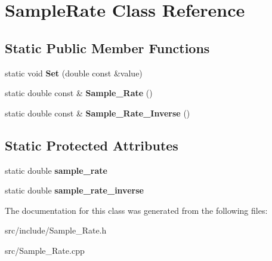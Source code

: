 \hypertarget{class_sample_rate}{\section{Sample\+Rate Class Reference}
\label{class_sample_rate}
}
\subsection*{Static Public Member Functions}
\begin{DoxyCompactItemize}
\item 
\hypertarget{class_sample_rate_aaaf581982c53f3392e79e425f978b510}{static void {\bfseries Set} (double const \&value)}\label{class_sample_rate_aaaf581982c53f3392e79e425f978b510}

\item 
\hypertarget{class_sample_rate_ae424b3d4a2cffd0ad7d2a726427373f5}{static double const \& {\bfseries Sample\+\_\+\+Rate} ()}\label{class_sample_rate_ae424b3d4a2cffd0ad7d2a726427373f5}

\item 
\hypertarget{class_sample_rate_a66ff6c645ab6112c58922c752e15b1b5}{static double const \& {\bfseries Sample\+\_\+\+Rate\+\_\+\+Inverse} ()}\label{class_sample_rate_a66ff6c645ab6112c58922c752e15b1b5}

\end{DoxyCompactItemize}
\subsection*{Static Protected Attributes}
\begin{DoxyCompactItemize}
\item 
\hypertarget{class_sample_rate_abbe099f4d2c79266a84581aa1e36de1a}{static double {\bfseries sample\+\_\+rate}}\label{class_sample_rate_abbe099f4d2c79266a84581aa1e36de1a}

\item 
\hypertarget{class_sample_rate_af6cf374a885e50aa61353f924cc06642}{static double {\bfseries sample\+\_\+rate\+\_\+inverse}}\label{class_sample_rate_af6cf374a885e50aa61353f924cc06642}

\end{DoxyCompactItemize}


The documentation for this class was generated from the following files\+:\begin{DoxyCompactItemize}
\item 
src/include/Sample\+\_\+\+Rate.\+h\item 
src/Sample\+\_\+\+Rate.\+cpp\end{DoxyCompactItemize}
